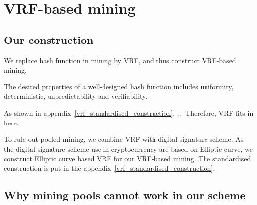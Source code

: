 \section{VRF-based mining}

\subsection{Our construction}

We replace hash function in mining by VRF, and thus construct VRF-based mining.

The desired properties of a well-designed hash function includes uniformity, deterministic, unpredictability and verifiability.


As shown in appendix~\ref{vrf_standardised_construction}, ...
Therefore, VRF fits in here.

To rule out pooled mining, we combine VRF with digital signature scheme.
As the digital signature scheme use in cryptocurrency are based on Elliptic curve, we construct Elliptic curve based VRF for our VRF-based mining.
The standardised construction is put in the appendix~\ref{vrf_standardised_construction}.

\subsection{Why mining pools cannot work in our scheme}



